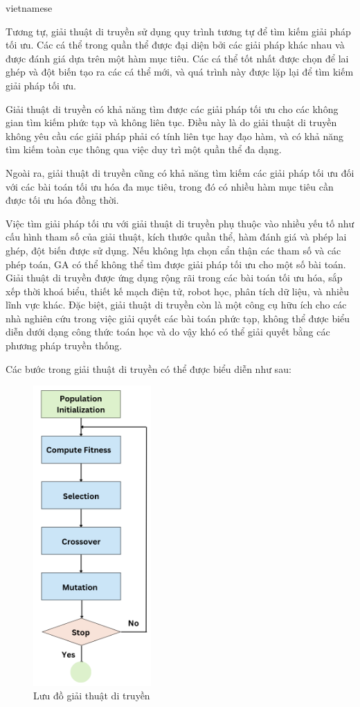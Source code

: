 \documentclass[a4paper]{article}
\begin{document}
\begin{otherlanguage*}{vietnamese}
\begin{enumerate}[leftmargin=7pt]
Tương tự, giải thuật di truyền sử dụng quy trình tương tự để tìm kiếm giải pháp tối ưu. Các cá thể trong quần thể được đại diện bởi các giải pháp khác nhau và được đánh giá dựa trên một hàm mục tiêu. Các cá thể tốt nhất được chọn để lai ghép và đột biến tạo ra các cá thể mới, và quá trình này được lặp lại để tìm kiếm giải pháp tối ưu.

Giải thuật di truyền có khả năng tìm được các giải pháp tối ưu cho các không gian tìm kiếm phức tạp và không liên tục. Điều này là do giải thuật di truyền không yêu cầu các giải pháp phải có tính liên tục hay đạo hàm, và có khả năng tìm kiếm toàn cục thông qua việc duy trì một quần thể đa dạng.

Ngoài ra, giải thuật di truyền cũng có khả năng tìm kiếm các giải pháp tối ưu đối với các bài toán tối ưu hóa đa mục tiêu, trong đó có nhiều hàm mục tiêu cần được tối ưu hóa đồng thời.

Việc tìm giải pháp tối ưu với giải thuật di truyền phụ thuộc vào nhiều yếu tố như cấu hình tham số của giải thuật, kích thước quần thể, hàm đánh giá và phép lai ghép, đột biến được sử dụng. Nếu không lựa chọn cẩn thận các tham số và các phép toán, GA có thể không thể tìm được giải pháp tối ưu cho một số bài toán. Giải thuật di truyền được ứng dụng rộng rãi trong các bài toán tối ưu hóa, sắp xếp thời khoá biểu, thiết kế mạch điện tử, robot học, phân tích dữ liệu, và nhiều lĩnh vực khác. Đặc biệt, giải thuật di truyền còn là một công cụ hữu ích cho các nhà nghiên cứu trong việc giải quyết các bài toán phức tạp, không thể được biểu diễn dưới dạng công thức toán học và do vậy khó có thể giải quyết bằng các phương pháp truyền thống.

Các bước trong giải thuật di truyền có thể được biểu diễn như sau:

\begin{figure}[!h]
    \centering
    \includegraphics[width=4.5cm]{ga.png}
    \caption{Lưu đồ giải thuật di truyền}
    \label{fig:ga}
\end{figure}


\end{enumerate}
\end{otherlanguage*}
\end{document}
